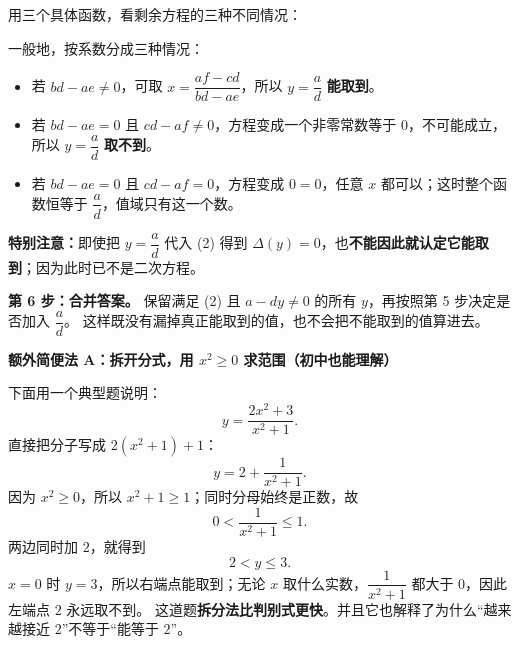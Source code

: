 \begin{proofbox}
用三个具体函数，看剩余方程的三种不同情况：
\begin{center}\end{center}
一般地，按系数分成三种情况：
  \begin{itemize}[leftmargin=*,itemsep=0.35em]
    \item 若 $bd-ae\ne0$，可取 $x=\dfrac{af-cd}{bd-ae}$，所以 $y=\dfrac ad$ \textbf{能取到}。
    \item 若 $bd-ae=0$ 且 $cd-af\ne0$，方程变成一个非零常数等于 $0$，不可能成立，所以 $y=\dfrac ad$ \textbf{取不到}。
    \item 若 $bd-ae=0$ 且 $cd-af=0$，方程变成 $0=0$，任意 $x$ 都可以；这时整个函数恒等于 $\dfrac ad$，值域只有这一个数。
  \end{itemize}
  \textbf{特别注意：}即使把 $y=\dfrac ad$ 代入 (2) 得到 $\Delta(y)=0$，也\textbf{不能因此就认定它能取到}；因为此时已不是二次方程。

  \medskip
  \textbf{第 6 步：合并答案。}
  保留满足 (2) 且 $a-dy\ne0$ 的所有 $y$，再按照第 5 步决定是否加入 $\dfrac ad$。
  这样既没有漏掉真正能取到的值，也不会把不能取到的值算进去。

  \bigskip
  \end{proofbox}
\clearpage
\begin{proofbox}
\textbf{\textcolor{CProof}{额外简便法 A：拆开分式，用 $x^2\ge0$ 求范围（初中也能理解）}}
\begin{center}\end{center}


  \medskip
  下面用一个典型题说明：
  \[
    y=\frac{2x^2+3}{x^2+1}.
  \]
  直接把分子写成 $2(x^2+1)+1$：
  \[
    y=2+\frac1{x^2+1}.
  \]
  因为 $x^2\ge0$，所以 $x^2+1\ge1$；同时分母始终是正数，故
  \[
    0<\frac1{x^2+1}\le1.
  \]
  两边同时加 $2$，就得到
  \[
    \boxed{2<y\le3.}
  \]
  $x=0$ 时 $y=3$，所以右端点能取到；无论 $x$ 取什么实数，$\dfrac1{x^2+1}$ 都大于 $0$，因此左端点 $2$ 永远取不到。
  这道题\textbf{拆分法比判别式更快}。并且它也解释了为什么“越来越接近 $2$”不等于“能等于 $2$”。

  \bigskip
  \end{proofbox}
\clearpage
